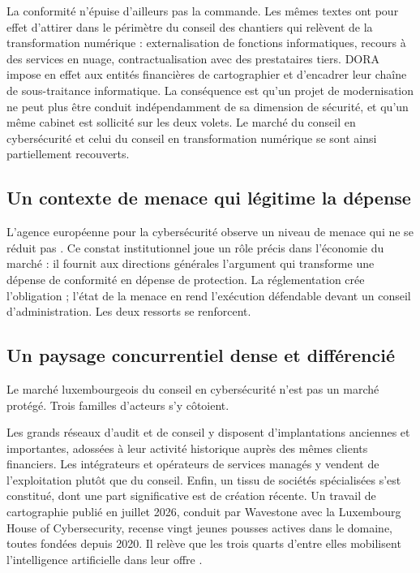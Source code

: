 La conformité n'épuise d'ailleurs pas la commande. Les mêmes textes ont pour effet
d'attirer dans le périmètre du conseil des chantiers qui relèvent de la transformation
numérique : externalisation de fonctions informatiques, recours à des services en nuage,
contractualisation avec des prestataires tiers. DORA impose en effet aux entités
financières de cartographier et d'encadrer leur chaîne de sous-traitance informatique. La
conséquence est qu'un projet de modernisation ne peut plus être conduit indépendamment de
sa dimension de sécurité, et qu'un même cabinet est sollicité sur les deux volets. Le
marché du conseil en cybersécurité et celui du conseil en transformation numérique se sont
ainsi partiellement recouverts.

\subsection{Un contexte de menace qui légitime la dépense}

L'agence européenne pour la cybersécurité observe un niveau de menace qui ne se réduit pas
\cite{enisa2025}. Ce constat institutionnel joue un rôle précis dans l'économie du marché :
il fournit aux directions générales l'argument qui transforme une dépense de conformité en
dépense de protection. La réglementation crée l'obligation ; l'état de la menace en rend
l'exécution défendable devant un conseil d'administration. Les deux ressorts se renforcent.

\subsection{Un paysage concurrentiel dense et différencié}

Le marché luxembourgeois du conseil en cybersécurité n'est pas un marché protégé. Trois
familles d'acteurs s'y côtoient.

Les grands réseaux d'audit et de conseil y disposent d'implantations anciennes et
importantes, adossées à leur activité historique auprès des mêmes clients financiers. Les
intégrateurs et opérateurs de services managés y vendent de l'exploitation plutôt que du
conseil. Enfin, un tissu de sociétés spécialisées s'est constitué, dont une part
significative est de création récente. Un travail de cartographie publié en juillet 2026,
conduit par Wavestone avec la Luxembourg House of Cybersecurity, recense vingt jeunes
pousses actives dans le domaine, toutes fondées depuis 2020. Il relève que les trois quarts
d'entre elles mobilisent l'intelligence artificielle dans leur offre
\cite{wavestone2026radar}.

